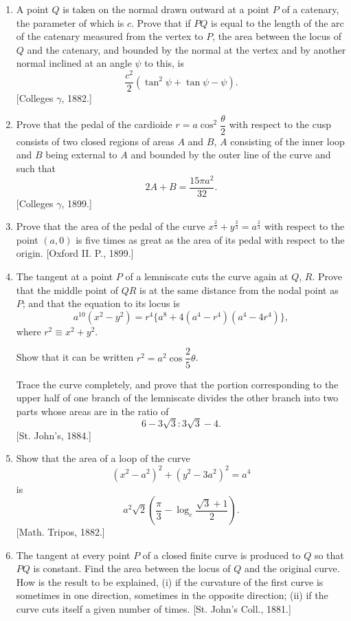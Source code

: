 \documentclass[11pt, a4paper]{article}
\newcommand{\source}[1]{\hfill\textnormal{[#1]}}
\begin{document}
\begin{enumerate}[leftmargin=2em]
\item A point $Q$ is taken on the normal drawn outward at a point $P$ of a catenary, the parameter of which is $c$. Prove that if $PQ$ is equal to the length of the arc of the catenary measured from the vertex to $P$, the area between the locus of $Q$ and the catenary, and bounded by the normal at the vertex and by another normal inclined at an angle $\psi$ to this, is
\[
\frac{c^2}{2}(\tan^2\psi+\tan\psi-\psi).
\]
\source{Colleges $\gamma$, 1882.}

\item Prove that the pedal of the cardioide $r=a\cos^2\dfrac{\theta}{2}$ with respect to the cusp consists of two closed regions of areas $A$ and $B$, $A$ consisting of the inner loop and $B$ being external to $A$ and bounded by the outer line of the curve and such that
\[
2A+B=\frac{15\pi a^2}{32}.
\]
\source{Colleges $\gamma$, 1899.}

\item Prove that the area of the pedal of the curve $x^{\frac23}+y^{\frac23}=a^{\frac23}$ with respect to the point $(a,0)$ is five times as great as the area of its pedal with respect to the origin. \source{Oxford II. P., 1899.}

\item The tangent at a point $P$ of a lemniscate cuts the curve again at $Q$, $R$. Prove that the middle point of $QR$ is at the same distance from the nodal point as $P$; and that the equation to its locus is
\[
a^{10}(x^2-y^2)=r^4\{a^8+4(a^4-r^4)(a^4-4r^4)\},
\]
where $r^2\equiv x^2+y^2$.

Show that it can be written $r^2=a^2\cos\dfrac25\theta$.

Trace the curve completely, and prove that the portion corresponding to the upper half of one branch of the lemniscate divides the other branch into two parts whose areas are in the ratio of
\[
6-3\sqrt3:3\sqrt3-4.
\]
\source{St. John's, 1884.}

\item Show that the area of a loop of the curve
\[
(x^2-a^2)^2+(y^2-3a^2)^2=a^4
\]
is
\[
a^2\sqrt2\left(\frac{\pi}{3}-\log_e\frac{\sqrt3+1}{2}\right).
\]
\source{Math. Tripos, 1882.}

\item The tangent at every point $P$ of a closed finite curve is produced to $Q$ so that $PQ$ is constant. Find the area between the locus of $Q$ and the original curve. How is the result to be explained, (i) if the curvature of the first curve is sometimes in one direction, sometimes in the opposite direction; (ii) if the curve cuts itself a given number of times. \source{St. John's Coll., 1881.}


\end{enumerate}
\end{document}

